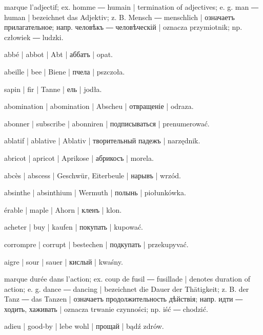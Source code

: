 \begin{outdent}{1em}

marque l’adjectif; ex.  homme ― 
humain | termination of adjectives; e. g.  man ―
 human | bezeichnet das Adjektiv; z. B.  Mensch ―
 menschlich | означаетъ прилагательное; напр.  человѣкъ ―
 человѣческій | oznacza przymiotnik; np.  człowiek ―  ludzki.

abbé | abbot | Abt | аббатъ | opat.

abeille | bee | Biene | пчела | pszczoła.

sapin | fir | Tanne | ель | jodła.

abomination | abomination | Abscheu | отвращеніе | odraza.

abonner | subscribe | abonniren | подписываться | prenumerować.

ablatif | ablative | Ablativ | творительный падежъ | narzędnik.

abricot | apricot | Aprikose | абрикосъ | morela.

abcès | abscess | Geschwür, Eiterbeule | нарывъ | wrzód.

absinthe | absinthium | Wermuth | полынь | piołunkówka.

érable | maple | Ahorn | кленъ | klon.

acheter | buy | kaufen | покупать | kupować.

\uvsubentry{}
corrompre | corrupt | bestechen | подкупать | przekupyvać.

aigre | sour | sauer | кислый | kwaśny.

marque durée dans l’action; ex.  coup de fusil 
―  fusillade | denotes duration of action; e. g. 
dance ―  dancing | bezeichnet die Dauer der Thätigkeit;
z. B.  der Tanz ―  das Tanzen | означаетъ 
продолжительность дѣйствія; напр.  идти ―  ходить, 
хаживать | oznacza trwanie czynności; np.  iść ― 
chodzić.

adieu | good-by | lebe wohl | прощай | bądź zdrów.


\end{outdent}
